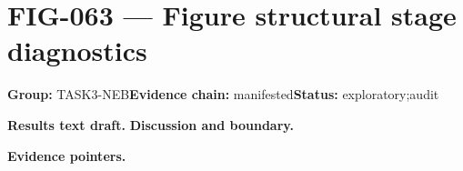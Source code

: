 \clearpage
\section{FIG-063 --- Figure structural stage diagnostics}
\label{figpage:fig-063}
\textbf{Group:} TASK3-NEB\quad \textbf{Evidence chain:} manifested\quad \textbf{Status:} exploratory;audit

\textbf{Results text draft.} 
\textbf{Discussion and boundary.} 


\textbf{Evidence pointers.}



\vfill
